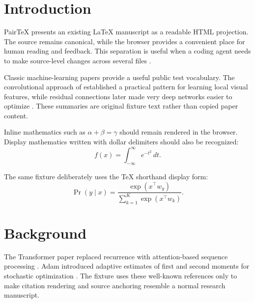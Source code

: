 \section{Introduction}
\label{sec:introduction}

PairTeX presents an existing LaTeX manuscript as a readable HTML projection.
The source remains canonical, while the browser provides a convenient place
for human reading and feedback. This separation is useful when a coding agent
needs to make source-level changes across several files \citep{goodfellow2016}.

Classic machine-learning papers provide a useful public test vocabulary. The
convolutional approach of \citet{lecun1998} established a practical pattern
for learning local visual features, while residual connections later made
very deep networks easier to optimize \citep{he2016}. These summaries are
original fixture text rather than copied paper content.

Inline mathematics such as $\alpha + \beta = \gamma$ should remain rendered
in the browser. Display mathematics written with dollar delimiters should also
be recognized:
\[
  f(x) = \int_{-\infty}^{\infty} e^{-t^2} \, dt.
\]

The same fixture deliberately uses the TeX shorthand display form:
$$
  \Pr(y \mid x) = \frac{\exp(x^\top w_y)}{\sum_{k=1}^{K}\exp(x^\top w_k)}.
$$

\section{Background}
\label{sec:background}

The Transformer paper replaced recurrence with attention-based sequence
processing \citep{vaswani2017}. Adam introduced adaptive estimates of first
and second moments for stochastic optimization \citep{kingma2014}. The
fixture uses these well-known references only to make citation rendering and
source anchoring resemble a normal research manuscript.
